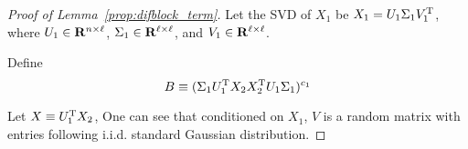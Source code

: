 \begin{proof}[Proof of Lemma~\ref{prop:difblock_term}]
Let the SVD of $X_1$ be $X_1 = U_1\Sigma_{1}V^{\mathrm{T}}_{1}$, where $U_1\in \mathbf{R}^{n\times \ell}$, $\Sigma_1 \in \mathbf{R}^{\ell \times \ell}$, and $V_{1} \in \mathbf{R}^{\ell \times \ell}$. 

Define 
\begin{equation}
B \equiv (\Sigma_{1}U^{\mathrm{T}}_{1}X_{2} X^{\mathrm{T}}_{2}U_{1}\Sigma_{1})^{c_1}
\end{equation}


Let $X \equiv U^{\mathrm{T}}_{1}X_{2}$, One can see that conditioned on $X_{1}$, $V$ is a random matrix with entries following i.i.d. standard Gaussian distribution.

\iffalse
Conditioned on $X_{1}$, 
\begin{equation}
\begin{split}
    \left(U^{\transpose}_{1}X_{2}\right)_{t,s}
    = & U_{t,:(1)}^{\transpose}X_{:,s(2)} \\
    &\sim N(0,1)
\end{split}
\end{equation}

\begin{equation}
\begin{split}
    E\left[U_{t,:(1)}^{\transpose}X_{:,s_1(2)}U_{t,:(1)}^{\transpose}X_{:,s_2(2)}\right] 
    &= E\left[U_{t,:(1)}^{\transpose}X_{:,s_1(2)}\right] E\left[U_{t,:(1)}^{\transpose}X_{:,s_2(2)} \right] \\
    &=0
\end{split}
\end{equation}
where $s_1 \neq s_2$ and $s_1,s_2 \in \left[ \ell\right]$.

\begin{equation}
\begin{split}
    E\left[U_{t_1,:(1)}^{\transpose}X_{:,s(2)}U_{t_2,:(1)}^{\transpose}X_{:,s(2)} \right] 
    &= E\left[U_{t_1,:(1)}^{\transpose}X_{:,s(2)}X^{\transpose}_{:,s(2)}U_{t_2,:(1)}\right]  \\
    &= U_{t_1,:(1)}^{\transpose}E\left[X_{:,s(2)}X^{\transpose}_{:,s(2)}\right]U_{t_2,:(1)}   \\
    &= U_{t_1,:(1)}^{\transpose}U_{t_2,:(1)} \\
    &= 0
\end{split}
\end{equation}
where $t_1 \neq t_2$ and $t_1,t_2 \in \left[ \ell\right]$. Conditioned on $X_{1}$, $U^{\transpose}_{X_1}X_2$ is a random matrix with entries following i.i.d. standard Gaussian distribution.
\fi


\end{proof}
